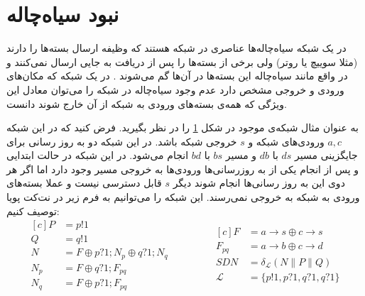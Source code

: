 \documentclass[
msc,
irfonts
]{./tex/tehran-thesis}
\newcommand{\پ}{پروژه/پایان‌نامه/رساله }
\theoremstyle{definition}
\theoremstyle{theorem}
\theoremstyle{definition}
\numberwithin{algorithm}{chapter}
\newcommand{\s}[1]{\{#1\}}
\newcommand{\ra}{\rightarrow}
\newcommand{\lf}[1]{\LTRfootnote{#1}}
\begin{document}
\section{نبود سیاه‌چاله}
در یک شبکه سیاه‌چاله‌ها\lf{Blackhole}
عناصری در شبکه هستند که وظیفه ارسال بسته‌ها را دارند
(مثلا سوییچ‌ یا روتر)
ولی برخی از بسته‌ها را پس از دریافت به جایی ارسال نمی‌کنند و در واقع مانند سیاه‌چاله این بسته‌ها در آن‌ها گم می‌شوند
\cite{network-abstractions}.
در یک شبکه که مکان‌های ورودی و خروجی مشخص دارد عدم وجود سیاه‌چاله در شبکه را می‌توان معادل این ويژگی که همه‌ی بسته‌های ورودی به شبکه از آن خارج شوند دانست.
\begin{figure}
    \centering
    \caption{ }
    \label{fig:blackhole}
\end{figure}
به عنوان مثال شبکه‌ی موجود در شکل
\ref{fig:blackhole}
را در نظر بگیرید.
فرض کنید که در این شبکه
$a,c$
ورودی‌های شبکه و
$s$
خروجی شبکه باشد.
در این شبکه دو به روز رسانی برای جایگزینی
مسیر
$ds$
با
$db$
و مسیر
$bs$
با
$bd$
انجام می‌شود.
در این شبکه در حالت ابتدایی و پس از انجام یکی از به روز‌رسانی‌ها ورودی‌ها به خروجی مسیر وجود دارد اما اگر هر دوی این به روز رسانی‌ها انجام شوند دیگر
$s$
قابل دسترسی نیست و عملا بسته‌های ورودی به شبکه به خروجی نمی‌رسند.
این شبکه را می‌توانیم به فرم زیر در نت‌کت پویا توصیف کنیم:
\begin{equation*}
    \begin{aligned}[c]
        P   & = p!1                             \\
        Q   & = q!1                             \\
        N   & = F \oplus p?1;N_p \oplus q?1;N_q \\
        N_p & = F \oplus q?1;F_{pq}             \\
        N_q & = F \oplus p?1;F_{pq}
    \end{aligned}
    \qquad\qquad
    \begin{aligned}[c]
        F           & = a\ra s \oplus c\ra s            \\
        F_{pq}      & = a\ra b \oplus c\ra d            \\
        SDN         & = \delta_{\mathcal{L}} (N
        \parallel P \parallel Q)                \\
        \mathcal{L} & = \s{p!1,p?1,q?1,q?1}
    \end{aligned}
\end{equation*}
\end{document}
